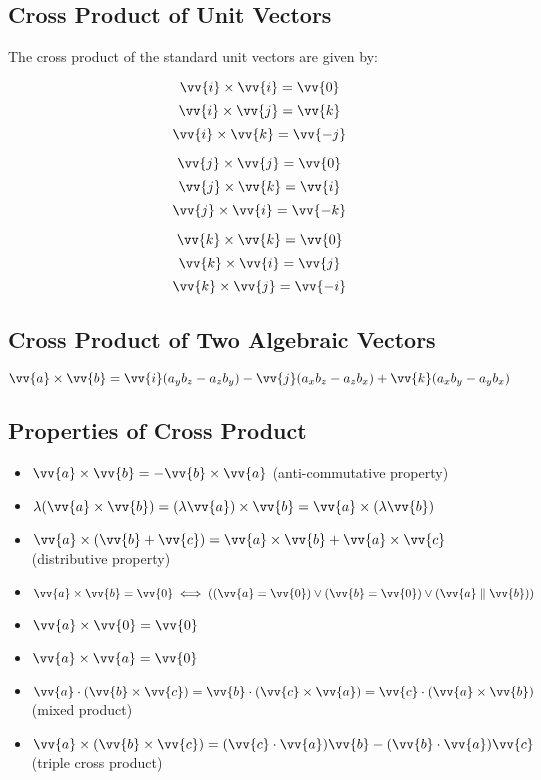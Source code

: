 		\subsection{Cross Product of Unit Vectors}
			The cross product of the standard unit vectors are given by:
			\begin{center}
				\begin{minipage}{0.3\textwidth}
					\[\vv{i} \times \vv{i} =\vv{0}\]
					\[\vv{i} \times \vv{j} =\vv{k}\]
					\[\vv{i} \times \vv{k} =\vv{-j}\]
				\end{minipage}
				\begin{minipage}{0.3\textwidth}
					\[\vv{j} \times \vv{j} =\vv{0}\]
					\[\vv{j} \times \vv{k} =\vv{i}\]
					\[\vv{j} \times \vv{i} =\vv{-k}\]
				\end{minipage}
				\begin{minipage}{0.3\textwidth}
					\[\vv{k} \times \vv{k} =\vv{0}\]
					\[\vv{k} \times \vv{i} =\vv{j}\]
					\[\vv{k} \times \vv{j} =\vv{-i}\]
				\end{minipage}
			\end{center}
		\subsection{Cross Product of Two Algebraic Vectors}
			\[\vv{a} \times \vv{b} = \vv{i}(a_yb_z - a_zb_y) -\vv{j}(a_xb_z - a_zb_x) + \vv{k}( a_xb_y - a_yb_x)\]
		\subsection{Properties of Cross Product}
			\begin{itemize}
				\item $\vv{a} \times \vv{b} = -\vv{b} \times \vv{a}$ \qquad (anti-commutative property)
				\item $\lambda(\vv{a} \times \vv{b}) = (\lambda\vv{a}) \times \vv{b} = \vv{a} \times (\lambda\vv{b})$
				\item $\vv{a} \times (\vv{b} + \vv{c}) = \vv{a} \times \vv{b} + \vv{a} \times \vv{c}$ \qquad (distributive property)
				\item $\vv{a} \times \vv{b} = \vv{0} \iff ((\vv{a} = \vv{0}) \vee (\vv{b} = \vv{0}) \vee (\vv{a} \parallel \vv{b}))$
				\item $\vv{a} \times \vv{0} = \vv{0}$
				\item $\vv{a} \times \vv{a} = \vv{0}$
				\item $\vv{a} \cdot (\vv{b} \times \vv{c}) = \vv{b} \cdot (\vv{c} \times \vv{a}) = \vv{c} \cdot (\vv{a} \times \vv{b})$ \qquad (mixed product)
				\item $\vv{a} \times (\vv{b} \times \vv{c}) = (\vv{c} \cdot \vv{a})\vv{b} - (\vv{b} \cdot \vv{a})\vv{c}$ \qquad (triple cross product)
			\end{itemize}
